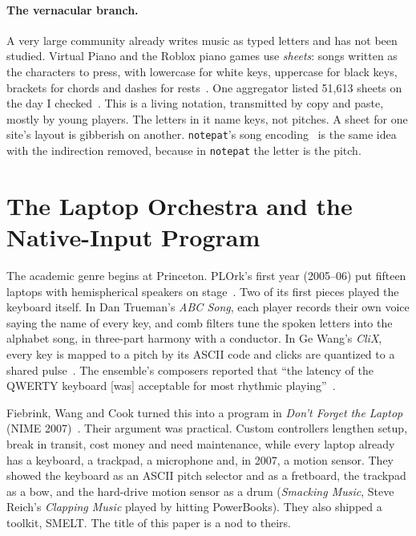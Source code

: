 \documentclass[10pt,letterpaper,twocolumn]{article}
\newcommand{\np}{\texttt{notepat}}
\begin{document}
\paragraph{The vernacular branch.} A very large community already writes music as typed letters and has not been studied. Virtual Piano and the Roblox piano games use \emph{sheets}: songs written as the characters to press, with lowercase for white keys, uppercase for black keys, brackets for chords and dashes for rests~\citep{virtualpiano_sheets}. One aggregator listed 51{,}613 sheets on the day I checked~\citep{pianoglow_sheets}. This is a living notation, transmitted by copy and paste, mostly by young players. The letters in it name keys, not pitches. A sheet for one site's layout is gibberish on another. \np{}'s song encoding~\citep{scudder2026folksongs} is the same idea with the indirection removed, because in \np{} the letter is the pitch.

\section{The Laptop Orchestra and the Native-Input Program}

The academic genre begins at Princeton. PLOrk's first year (2005--06) put fifteen laptops with hemispherical speakers on stage~\citep{trueman2006plork}. Two of its first pieces played the keyboard itself. In Dan Trueman's \emph{ABC Song}, each player records their own voice saying the name of every key, and comb filters tune the spoken letters into the alphabet song, in three-part harmony with a conductor. In Ge Wang's \emph{CliX}, every key is mapped to a pitch by its ASCII code and clicks are quantized to a shared pulse~\citep{wang2006clix}. The ensemble's composers reported that ``the latency of the QWERTY keyboard [was] acceptable for most rhythmic playing''~\citep{smallwood2008composing}.

Fiebrink, Wang and Cook turned this into a program in \emph{Don't Forget the Laptop} (NIME 2007)~\citep{fiebrink2007laptop}. Their argument was practical. Custom controllers lengthen setup, break in transit, cost money and need maintenance, while every laptop already has a keyboard, a trackpad, a microphone and, in 2007, a motion sensor. They showed the keyboard as an ASCII pitch selector and as a fretboard, the trackpad as a bow, and the hard-drive motion sensor as a drum (\emph{Smacking Music}, Steve Reich's \emph{Clapping Music} played by hitting PowerBooks). They also shipped a toolkit, SMELT. The title of this paper is a nod to theirs.
\end{document}
